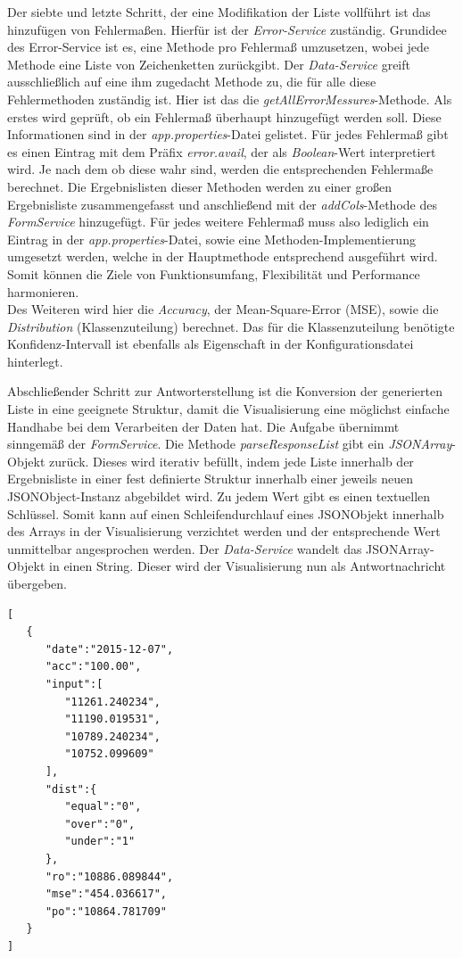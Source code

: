Der siebte und letzte Schritt, der eine Modifikation der Liste vollführt ist das hinzufügen von Fehlermaßen. Hierfür ist der \emph{Error-Service} zuständig. Grundidee des Error-Service ist es, eine Methode pro Fehlermaß umzusetzen, wobei jede Methode eine Liste von Zeichenketten zurückgibt. Der \emph{Data-Service} greift ausschließlich auf eine ihm zugedacht Methode zu, die für alle diese Fehlermethoden zuständig ist. Hier ist das die \emph{getAllErrorMessures}-Methode. Als erstes wird geprüft, ob ein Fehlermaß überhaupt hinzugefügt werden soll. Diese Informationen sind in der \emph{app.properties}-Datei gelistet. Für jedes Fehlermaß gibt es einen Eintrag mit dem Präfix \emph{error.avail}, der als \emph{Boolean}-Wert interpretiert wird. Je nach dem ob diese wahr sind, werden die entsprechenden Fehlermaße berechnet. Die Ergebnislisten dieser Methoden werden zu einer großen Ergebnisliste zusammengefasst und anschließend mit der \emph{addCols}-Methode des \emph{FormService} hinzugefügt.
Für jedes weitere Fehlermaß muss also lediglich ein Eintrag in der \emph{app.properties}-Datei, sowie eine Methoden-Implementierung umgesetzt werden, welche in der Hauptmethode entsprechend ausgeführt wird. Somit können die Ziele von Funktionsumfang, Flexibilität und Performance harmonieren.\\
Des Weiteren wird hier die \emph{Accuracy}, der Mean-Square-Error (MSE), sowie die \emph{Distribution} (Klassenzuteilung) berechnet. Das für die Klassenzuteilung benötigte Konfidenz-Intervall ist ebenfalls als Eigenschaft in der Konfigurationsdatei hinterlegt. 

Abschließender Schritt zur Antworterstellung ist die Konversion der generierten Liste in eine geeignete Struktur, damit die Visualisierung eine möglichst einfache Handhabe bei dem Verarbeiten der Daten hat. Die Aufgabe übernimmt sinngemäß der \emph{FormService}. Die Methode \emph{parseResponseList} gibt ein \emph{JSONArray}-Objekt zurück. Dieses wird iterativ befüllt, indem jede Liste innerhalb der Ergebnisliste in einer fest definierte Struktur innerhalb einer jeweils neuen JSONObject-Instanz abgebildet wird. Zu jedem Wert gibt es einen textuellen Schlüssel. Somit kann auf einen Schleifendurchlauf eines JSONObjekt innerhalb des Arrays in der Visualisierung verzichtet werden und der entsprechende Wert unmittelbar angesprochen werden. Der \emph{Data-Service} wandelt das JSONArray-Objekt in einen String. Dieser wird der Visualisierung nun als Antwortnachricht übergeben. 


\begin{lstlisting}[basicstyle=\scriptsize, caption=Beispiel - JSONArray]
[  
   {  
      "date":"2015-12-07",
      "acc":"100.00",
      "input":[  
         "11261.240234",
         "11190.019531",
         "10789.240234",
         "10752.099609"
      ],
      "dist":{  
         "equal":"0",
         "over":"0",
         "under":"1"
      },
      "ro":"10886.089844",
      "mse":"454.036617",
      "po":"10864.781709"
   }
]
\end{lstlisting}



